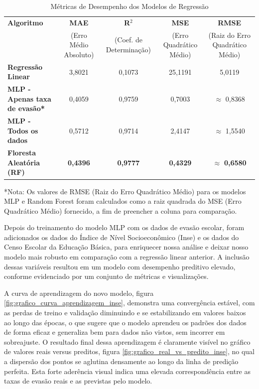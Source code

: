 \documentclass[english, spanish, brazilian]{RBIEarticle} %
\begin{document}
\begin{table}[h]
    \centering
    \caption{Métricas de Desempenho dos Modelos de Regressão}
    \label{tab:modelos_desempenho}
    \begin{tabular}{l c c c c}
        \toprule
        \textbf{Algoritmo} & \textbf{MAE} & \textbf{R$^2$} & \textbf{MSE} & \textbf{RMSE} \\
        \textbf{} & \tiny{(Erro Médio Absoluto)} & \tiny{(Coef. de Determinação)} & \tiny{(Erro Quadrático Médio)} & \tiny{(Raiz do Erro Quadrático Médio)} \\
        \midrule
        \textbf{Regressão Linear} & 3,8021 & 0,1073 & 25,1191 & 5,0119 \\
        \textbf{MLP - Apenas taxa de evasão*} & 0,4059 & 0,9759 & 0,7003 & $\approx$ 0,8368 \\
        \textbf{MLP - Todos os dados} & 0,5712 & 0,9714 & 2,4147 & $\approx$ 1,5540 \\
        \textbf{Floresta Aleatória (RF)} & \textbf{0,4396} & \textbf{0,9777} & \textbf{0,4329} & $\approx$ \textbf{0,6580} \\
        \bottomrule
    \end{tabular}
    \vspace{0.5em}
    \raggedright
    \footnotesize
    *Nota: Os valores de RMSE (Raiz do Erro Quadrático Médio) para os modelos MLP e Random Forest foram calculados como a raiz quadrada do MSE (Erro Quadrático Médio) fornecido, a fim de preencher a coluna para comparação.
\end{table}

Depois do treinamento do modelo MLP com os dados de evasão escolar, foram adicionados os dados do Índice de Nível Socioeconômico (Inse) e os dados do Censo Escolar da Educação Básica, para enriquecer nossa análise e deixar nosso modelo mais robusto em comparação com a regressão linear anterior. A inclusão dessas variáveis resultou em um modelo com desempenho preditivo elevado, conforme evidenciado por um conjunto de métricas e visualizações.

A curva de aprendizagem do novo modelo, figura \ref{fig:grafico_curva_aprendizagem_inse}, demonstra uma convergência estável, com as perdas de treino e validação diminuindo e se estabilizando em valores baixos ao longo das épocas, o que sugere que o modelo aprendeu os padrões dos dados de forma eficaz e generaliza bem para dados não vistos, sem incorrer em sobreajuste. O resultado final dessa aprendizagem é claramente visível no gráfico de valores reais versus preditos, figura \ref{fig:grafico_real_vs_predito_inse}, no qual a dispersão dos pontos se aglutina densamente ao longo da linha de predição perfeita. Esta forte aderência visual indica uma elevada correspondência entre as taxas de evasão reais e as previstas pelo modelo.
\end{document}
